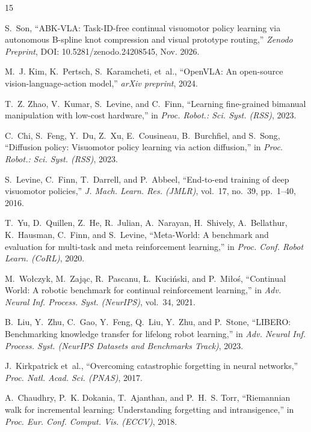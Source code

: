 \documentclass[10pt,twocolumn]{article}
\begin{document}
\begin{thebibliography}{15}
\footnotesize
\setlength{\itemsep}{0.9pt}
\setlength{\parskip}{0pt}

S.~Son, ``ABK-VLA: Task-ID-free continual visuomotor policy learning via autonomous B-spline knot compression and visual prototype routing,'' \emph{Zenodo Preprint}, DOI: 10.5281/zenodo.24208545, Nov. 2026.

M.~J. Kim, K.~Pertsch, S.~Karamcheti, et~al., ``OpenVLA: An open-source vision-language-action model,'' \emph{arXiv preprint}, 2024.

T.~Z. Zhao, V.~Kumar, S.~Levine, and C.~Finn, ``Learning fine-grained bimanual manipulation with low-cost hardware,'' in \emph{Proc. Robot.: Sci. Syst. (RSS)}, 2023.

C.~Chi, S.~Feng, Y.~Du, Z.~Xu, E.~Cousineau, B.~Burchfiel, and S.~Song, ``Diffusion policy: Visuomotor policy learning via action diffusion,'' in \emph{Proc. Robot.: Sci. Syst. (RSS)}, 2023.

S.~Levine, C.~Finn, T.~Darrell, and P.~Abbeel, ``End-to-end training of deep visuomotor policies,'' \emph{J. Mach. Learn. Res. (JMLR)}, vol.~17, no.~39, pp.~1--40, 2016.

T.~Yu, D.~Quillen, Z.~He, R.~Julian, A.~Narayan, H.~Shively, A.~Bellathur, K.~Hausman, C.~Finn, and S.~Levine, ``Meta-World: A benchmark and evaluation for multi-task and meta reinforcement learning,'' in \emph{Proc. Conf. Robot Learn. (CoRL)}, 2020.

M.~Wo{\l}czyk, M.~Zaj\k{a}c, R.~Pascanu, {\L}.~Kuci\'{n}ski, and P.~Mi{\l}o\'{s}, ``Continual World: A robotic benchmark for continual reinforcement learning,'' in \emph{Adv. Neural Inf. Process. Syst. (NeurIPS)}, vol.~34, 2021.

B.~Liu, Y.~Zhu, C.~Gao, Y.~Feng, Q.~Liu, Y.~Zhu, and P.~Stone, ``LIBERO: Benchmarking knowledge transfer for lifelong robot learning,'' in \emph{Adv. Neural Inf. Process. Syst. (NeurIPS Datasets and Benchmarks Track)}, 2023.

J.~Kirkpatrick et~al., ``Overcoming catastrophic forgetting in neural networks,'' \emph{Proc. Natl. Acad. Sci. (PNAS)}, 2017.

A.~Chaudhry, P.~K. Dokania, T.~Ajanthan, and P.~H.~S. Torr, ``Riemannian walk for incremental learning: Understanding forgetting and intransigence,'' in \emph{Proc. Eur. Conf. Comput. Vis. (ECCV)}, 2018.


\end{thebibliography}
\end{document}
